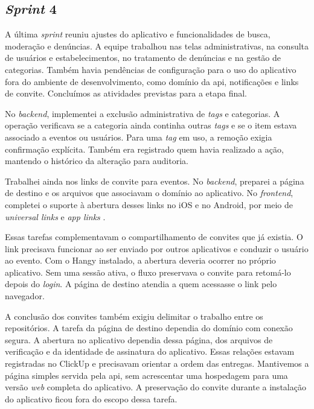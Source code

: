 \subsection{\textit{Sprint} 4}

A última \textit{sprint} reuniu ajustes do aplicativo e funcionalidades de
busca, moderação e denúncias. A equipe trabalhou nas telas administrativas,
na consulta de usuários e estabelecimentos, no tratamento de denúncias e na
gestão de categorias. Também havia pendências de configuração para o uso do
aplicativo fora do ambiente de desenvolvimento, como domínio da \ac{api},
notificações e links de convite. Concluímos as atividades previstas para a
etapa final.

No \textit{backend}, implementei a exclusão administrativa de
\textit{tags} e categorias. A operação verificava se a categoria ainda
continha outras \textit{tags} e se o item estava associado a eventos ou
usuários. Para uma \textit{tag} em uso, a remoção exigia confirmação explícita.
Também era registrado quem havia realizado a ação, mantendo o histórico da
alteração para auditoria.

Trabalhei ainda nos links de convite para eventos. No \textit{backend},
preparei a página de destino e os arquivos que associavam o domínio ao
aplicativo. No \textit{frontend}, completei o suporte à abertura desses links
no iOS e no Android, por meio de \textit{universal links} e
\textit{app links} \cite{apple-universal-links,android-app-links}.

Essas tarefas complementavam o compartilhamento de convites que já existia.
O link precisava funcionar ao ser enviado por outros aplicativos e conduzir
o usuário ao evento. Com o Hangy instalado, a abertura deveria ocorrer no
próprio aplicativo. Sem uma sessão ativa, o fluxo preservava o convite para
retomá-lo depois do \textit{login}. A página de destino atendia a quem
acessasse o link pelo navegador.

A conclusão dos convites também exigiu delimitar o trabalho entre os
repositórios. A tarefa da página de destino dependia do domínio com
conexão segura. A abertura no aplicativo dependia dessa página, dos arquivos
de verificação e da identidade de assinatura do aplicativo. Essas relações
estavam registradas no ClickUp e precisavam orientar a ordem das entregas.
Mantivemos a página simples servida pela \ac{api}, sem acrescentar uma
hospedagem para uma versão \textit{web} completa do aplicativo. A preservação
do convite durante a instalação do aplicativo ficou fora do escopo dessa
tarefa.

